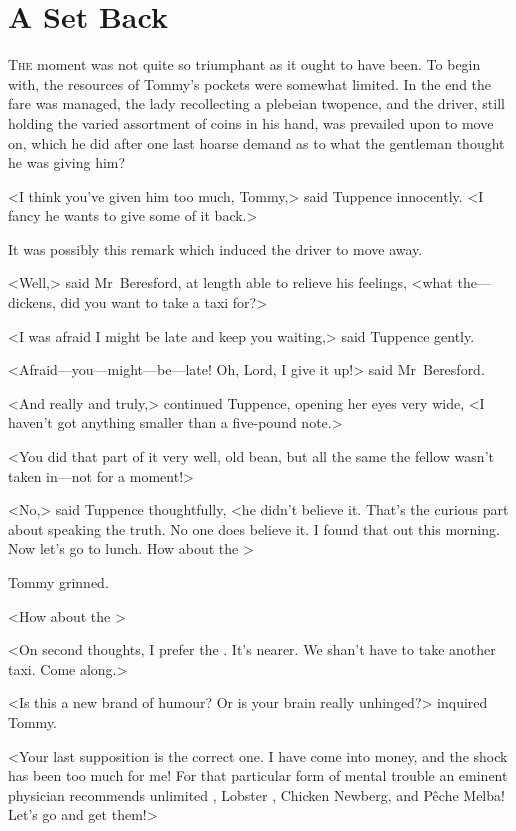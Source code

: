 \chapter{A Set Back} 

 \lettrine{T}{he} moment was not quite so triumphant as it ought to have been. To begin with, the resources of Tommy's pockets were somewhat limited. In the end the fare was managed, the lady recollecting a plebeian twopence, and the driver, still holding the varied assortment of coins in his hand, was prevailed upon to move on, which he did after one last hoarse demand as to what the gentleman thought he was giving him?

<I think you've given him too much, Tommy,> said Tuppence innocently. <I fancy he wants to give some of it back.>

It was possibly this remark which induced the driver to move away.

<Well,> said Mr~Beresford, at length able to relieve his feelings, <what the—dickens, did you want to take a taxi for?>

<I was afraid I might be late and keep you waiting,> said Tuppence gently.

<Afraid—you—might—be—late! Oh, Lord, I give it up!> said Mr~Beresford.

<And really and truly,> continued Tuppence, opening her eyes very wide, <I haven't got anything smaller than a five-pound note.>

<You did that part of it very well, old bean, but all the same the fellow wasn't taken in—not for a moment!>

<No,> said Tuppence thoughtfully, <he didn't believe it. That's the curious part about speaking the truth. No one does believe it. I found that out this morning. Now let's go to lunch. How about the >

Tommy grinned.

<How about the >

<On second thoughts, I prefer the . It's nearer. We shan't have to take another taxi. Come along.>

<Is this a new brand of humour? Or is your brain really unhinged?> inquired Tommy.

<Your last supposition is the correct one. I have come into money, and the shock has been too much for me! For that particular form of mental trouble an eminent physician recommends unlimited , Lobster , Chicken Newberg, and Pêche Melba! Let's go and get them!>

